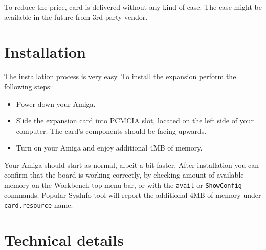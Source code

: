 \documentclass[10pt,a5paper]{article}
\begin{document}
To reduce the price, card is delivered without any kind of case. The case might be available in the future from 3rd party vendor.

\section*{Installation}

The installation process is very easy. To install the expansion perform the following steps:

\begin{itemize}
	\item Power down your Amiga.
	\item Slide the expansion card into PCMCIA slot, located on the left side of your computer. The card's components should be facing upwards.
	\item Turn on your Amiga and enjoy additional 4MB of memory.
\end{itemize}

Your Amiga should start as normal, albeit a bit faster. After installation you can confirm that the board is working correctly, by checking amount of available memory on the Workbench top menu bar, or with the {\tt avail} or {\tt ShowConfig} commands. Popular SysInfo tool will report the additional 4MB of memory under {\tt card.resource} name.

\section*{Technical details}
\end{document}
